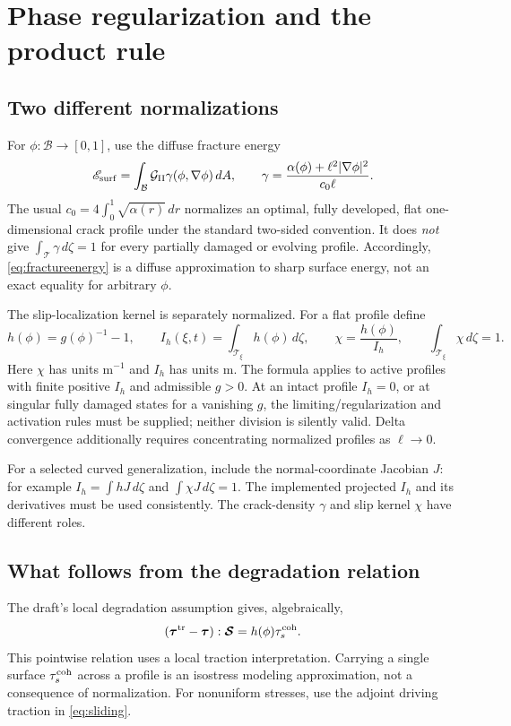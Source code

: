 \documentclass[10pt,letterpaper]{article}
\newcommand{\B}{\mathcal B}
\newcommand{\SSS}{\bm{\mathcal S}}
\newcommand{\ta}{\bm\tau}
\newcommand{\tat}{\bm\tau^{\rm tr}}
\newcommand{\qcoh}{\tau_s^{\rm coh}}
\begin{document}
\section{Phase regularization and the product rule}
\subsection{Two different normalizations}
For $\phi:\B\to[0,1]$, use the diffuse fracture energy
\begin{equation}
 \mathscr E_{\rm surf}=\int_{\B}\mathcal G_{\rm II}\gamma(\phi,\nabla\phi)\,dA,
 \qquad \gamma=\frac{\alpha(\phi)+\ell^2|\nabla\phi|^2}{c_0\ell}. \label{eq:fractureenergy}
\end{equation}
The usual $c_0=4\int_0^1\sqrt{\alpha(r)}\,dr$ normalizes an optimal, fully developed, flat one-dimensional crack profile under the standard two-sided convention. It does \emph{not} give $\int_{\mathcal T}\gamma\,d\zeta=1$ for every partially damaged or evolving profile. Accordingly, \eqref{eq:fractureenergy} is a diffuse approximation to sharp surface energy, not an exact equality for arbitrary $\phi$.

The slip-localization kernel is separately normalized. For a flat profile define
\begin{equation}
 h(\phi)=g(\phi)^{-1}-1,\qquad
 I_h(\xi,t)=\int_{\mathcal T_\xi}h(\phi)\,d\zeta,\qquad
 \chi=\frac{h(\phi)}{I_h},\qquad \int_{\mathcal T_\xi}\chi\,d\zeta=1. \label{eq:chi}
\end{equation}
Here $\chi$ has units $\mathrm m^{-1}$ and $I_h$ has units $\mathrm m$. The formula applies to active profiles with finite positive $I_h$ and admissible $g>0$. At an intact profile $I_h=0$, or at singular fully damaged states for a vanishing $g$, the limiting/regularization and activation rules must be supplied; neither division is silently valid. Delta convergence additionally requires concentrating normalized profiles as $\ell\to0$.

For a selected curved generalization, include the normal-coordinate Jacobian $J$: for example $I_h=\int hJ\,d\zeta$ and $\int\chi J\,d\zeta=1$. The implemented projected $I_h$ and its derivatives must be used consistently. The crack-density $\gamma$ and slip kernel $\chi$ have different roles.

\subsection{What follows from the degradation relation}
The draft's local degradation assumption gives, algebraically,
\begin{equation}
 (\tat-\ta):\SSS=h(\phi)\qcoh. \label{eq:degradation}
\end{equation}
This pointwise relation uses a local traction interpretation. Carrying a single surface $\qcoh$ across a profile is an isostress modeling approximation, not a consequence of normalization. For nonuniform stresses, use the adjoint driving traction in \eqref{eq:sliding}.
\end{document}
